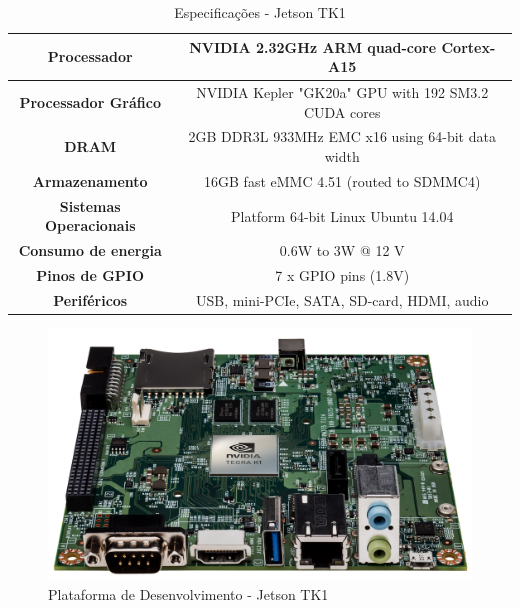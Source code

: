 \begin{table}[]
\centering
\caption{Especificações - Jetson TK1}
\label{jetson_tk1_tab}
\begin{tabular}{|c|c|}
\hline
\textbf{Processador}           & NVIDIA 2.32GHz ARM quad-core Cortex-A15              \\	\hline
\textbf{Processador Gráfico}   & NVIDIA Kepler "GK20a" GPU  with 192 SM3.2 CUDA cores \\	\hline
\textbf{DRAM}                  & 2GB DDR3L 933MHz EMC x16 using 64-bit data width     \\	\hline
\textbf{Armazenamento}         & 16GB fast eMMC 4.51 (routed to SDMMC4)               \\	\hline
\textbf{Sistemas Operacionais} & Platform 64-bit Linux Ubuntu 14.04                   \\	\hline
\textbf{Consumo de energia}    & 0.6W to 3W @ 12 V                                    \\	\hline
\textbf{Pinos de GPIO}         & 7 x GPIO pins (1.8V)                                 \\	\hline
\textbf{Periféricos}           & USB, mini-PCIe, SATA, SD-card, HDMI, audio           \\	\hline
\end{tabular}
\end{table}

\begin{figure}[H]
	\centering
	\includegraphics[scale=0.10]{./Resources/jetson_tk1.jpg}
	\caption{Plataforma de Desenvolvimento - Jetson TK1}
	\label{jetson_tk1}
\end{figure}


